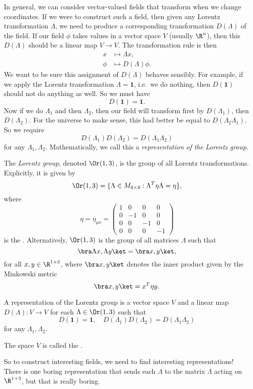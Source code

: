 \documentclass[a4paper]{article}
\begin{document}
In general, we can consider vector-valued fields that transform when we change coordinates. If we were to construct such a field, then given any Lorentz transformation $\Lambda$, we need to produce a corresponding transformation $D(\Lambda)$ of the field. If our field $\phi$ takes values in a vector space $V$ (usually $\R^n$), then this $D(\Lambda)$ should be a linear map $V \to V$. The transformation rule is then
\begin{align*}
  x &\mapsto \Lambda x,\\
  \phi &\mapsto D(\Lambda) \phi.
\end{align*}
We want to be sure this assignment of $D(\Lambda)$ behaves sensibly. For example, if we apply the Lorentz transformation $\Lambda = \mathbf{1}$, i.e.\ we do nothing, then $D(\mathbf{1})$ should not do anything as well. So we must have
\[
  D(\mathbf{1}) = \mathbf{1}.
\]
Now if we do $\Lambda_1$ and then $\Lambda_2$, then our field will transform first by $D(\Lambda_1)$, then $D(\Lambda_2)$. For the universe to make sense, this had better be equal to $D(\Lambda_2 \Lambda_1)$. So we require
\[
  D(\Lambda_1)D(\Lambda_2) = D(\Lambda_1 \Lambda_2)
\]
for any $\Lambda_1, \Lambda_2$. Mathematically, we call this a \emph{representation of the Lorentz group}.
\begin{defi}
  The \emph{Lorentz group}, denoted $\Or(1, 3)$, is the group of all Lorentz transformations. Explicitly, it is given by
  \[
    \Or(1, 3) = \{\Lambda \in M_{4\times 4}: \Lambda^T \eta \Lambda = \eta\},
  \]
  where
  \[
    \eta = \eta_{\mu\nu} =
    \begin{pmatrix}
      1 & 0 & 0 & 0\\
      0 & -1 & 0 & 0\\
      0 & 0 & -1 & 0\\
      0 & 0 & 0 & -1
    \end{pmatrix}
  \]
  is the . Alternatively, $\Or(1, 3)$ is the group of all matrices $\Lambda$ such that
  \[
    \bra \Lambda x, \Lambda y\ket = \bra x, y\ket,
  \]
  for all $x, y \in \R^{1 + 3}$, where $\bra x, y\ket$ denotes the inner product given by the Minkowski metric
  \[
    \bra x, y\ket = x^T \eta y.
  \]
\end{defi}
\begin{defi}
  A representation of the Lorentz group is a vector space $V$ and a linear map $D(\Lambda): V \to V$ for each $\Lambda \in \Or(1, 3)$ such that
  \[
    D(\mathbf{1}) = \mathbf{1}, \quad D(\Lambda_1)D(\Lambda_2) = D(\Lambda_1 \Lambda_2)
  \]
  for any $\Lambda_1, \Lambda_2$.

  The space $V$ is called the .
\end{defi}
So to construct interesting fields, we need to find interesting representations! There is one boring representation that sends each $\Lambda$ to the matrix $\Lambda$ acting on $\R^{1 + 3}$, but that is really boring.
\end{document}
